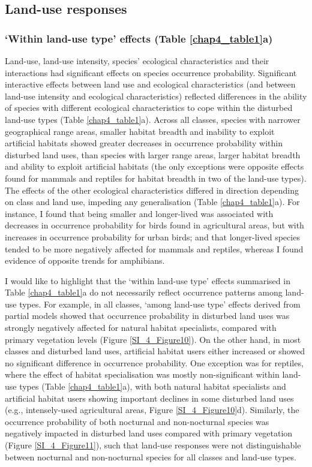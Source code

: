 \subsection{Land-use responses}

\subsubsection{`Within land-use type' effects (Table \ref{chap4_table1}a)}
Land-use, land-use intensity, species' ecological characteristics and their interactions had significant effects on species occurrence probability. Significant interactive effects between land use and ecological characteristics (and between land-use intensity and ecological characteristics) reflected differences in the ability of species with different ecological characteristics to cope within the disturbed land-use types (Table \ref{chap4_table1}a). Across all classes, species with narrower geographical range areas, smaller habitat breadth and inability to exploit artificial habitats showed greater decreases in occurrence probability within disturbed land uses, than species with larger range areas, larger habitat breadth and ability to exploit artificial habitats (the only exceptions were opposite effects found for mammals and reptiles for habitat breadth in two of the land-use types). The effects of the other ecological characteristics differed in direction depending on class and land use, impeding any generalisation (Table \ref{chap4_table1}a). For instance, I found that being smaller and longer-lived was associated with decreases in occurrence probability for birds found in agricultural areas, but with increases in occurrence probability for urban birds; and that  longer-lived species tended to be more negatively affected for mammals and reptiles, whereas I found evidence of opposite trends for amphibians.

I would like to highlight that the `within land-use type' effects summarised in Table \ref{chap4_table1}a do not necessarily reflect occurrence patterns among land-use types. For example, in all classes, `among land-use type' effects derived from partial models showed that occurrence probability in disturbed land uses was strongly negatively affected for natural habitat specialists, compared with primary vegetation levels (Figure \ref{SI_4_Figure10}). On the other hand, in most classes and disturbed land uses, artificial habitat users either increased or showed no significant difference in occurrence probability. One exception was for reptiles, where the effect of habitat specialisation was mostly non-significant within land-use types (Table \ref{chap4_table1}a), with both natural habitat specialists and artificial habitat users showing important declines in some disturbed land uses (e.g., intensely-used agricultural areas, Figure \ref{SI_4_Figure10}d). Similarly, the occurrence probability of both nocturnal and non-nocturnal species was negatively impacted in disturbed land uses compared with primary vegetation (Figure \ref{SI_4_Figure11}), such that land-use responses were not distinguishable between nocturnal and non-nocturnal species for all classes and land-use types. 


